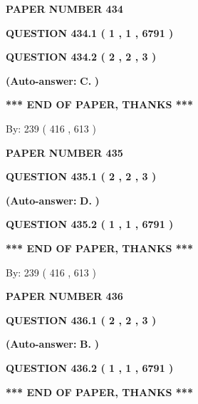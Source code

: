 \documentclass[12pt]{article}
\begin{document}
   
 {\textbf{ \Large{ PAPER NUMBER  434  }}}
   
   
   
   
  
  
{\textbf{\large{QUESTION
434.1 
 ( 1 , 1 , 6791 )
}}}
  
  
{\textbf{\large{QUESTION
434.2 
 ( 2 , 2 , 3 )
}}}
 
 
{\textbf{(Auto-answer:}}
{\textbf{\large{
C.}}}
{\textbf{)}}
 
 
   
   
   
   
\vspace{1.0in} 
{\textbf{\large{ *** END OF PAPER, THANKS *** }}} 
   
   
\hspace{1.0in} By: 
 239 ( 416 ,  613 )
   
   
   
   
\newpage 
\setcounter{page}{ 
   435001 } 
   
   
 {\textbf{ \Large{ PAPER NUMBER  435  }}}
   
   
   
   
  
  
{\textbf{\large{QUESTION
435.1 
 ( 2 , 2 , 3 )
}}}
 
 
{\textbf{(Auto-answer:}}
{\textbf{\large{
D.}}}
{\textbf{)}}
 
 
  
  
{\textbf{\large{QUESTION
435.2 
 ( 1 , 1 , 6791 )
}}}
   
   
   
   
\vspace{1.0in} 
{\textbf{\large{ *** END OF PAPER, THANKS *** }}} 
   
   
\hspace{1.0in} By: 
 239 ( 416 ,  613 )
   
   
   
   
\newpage 
\setcounter{page}{ 
   436001 } 
   
   
 {\textbf{ \Large{ PAPER NUMBER  436  }}}
   
   
   
   
  
  
{\textbf{\large{QUESTION
436.1 
 ( 2 , 2 , 3 )
}}}
 
 
{\textbf{(Auto-answer:}}
{\textbf{\large{
B.}}}
{\textbf{)}}
 
 
  
  
{\textbf{\large{QUESTION
436.2 
 ( 1 , 1 , 6791 )
}}}
   
   
   
   
\vspace{1.0in} 
{\textbf{\large{ *** END OF PAPER, THANKS *** }}} 
   
\end{document}
